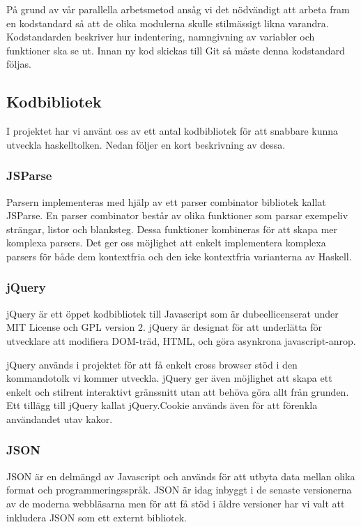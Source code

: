 På grund av vår parallella arbetsmetod ansåg vi det nödvändigt att arbeta fram en kodstandard så att de olika modulerna skulle stilmässigt likna varandra. Kodstandarden beskriver hur indentering, namngivning av variabler och funktioner ska se ut. Innan ny kod skickas till Git så måste denna kodstandard följas.  


\subsection{Kodbibliotek}
I projektet har vi använt oss av ett antal kodbibliotek för att snabbare kunna utveckla haskelltolken. Nedan följer en kort beskrivning av dessa.

\subsubsection{JSParse}  
Parsern implementeras med hjälp av ett parser combinator bibliotek kallat JSParse. 
En parser combinator består av olika funktioner som parsar exempeliv strängar, listor och blanksteg.
Dessa funktioner kombineras för att skapa mer komplexa parsers. Det ger oss möjlighet att enkelt implementera komplexa
parsers för både dem kontextfria och den icke kontextfria varianterna av Haskell.

\subsubsection{jQuery} 
jQuery är ett öppet kodbibliotek till Javascript som är dubeellicenserat under MIT License och GPL version 2.  
jQuery är designat för att underlätta för utvecklare att modifiera DOM-träd, HTML, och göra asynkrona javascript-anrop.

jQuery används i projektet för att få enkelt cross browser stöd i den kommandotolk vi kommer utveckla. 
jQuery ger även möjlighet att skapa ett enkelt och stilrent interaktivt gränssnitt utan att behöva göra allt från grunden.
Ett tillägg till jQuery kallat jQuery.Cookie används även för att förenkla användandet utav kakor.

\subsubsection{JSON}
JSON är en delmängd av Javascript och används för att utbyta data mellan olika format och programmeringsspråk. 
JSON är idag inbyggt i de senaste versionerna av de moderna webbläsarna men för att få stöd i äldre versioner har vi valt att inkludera JSON som ett externt bibliotek.

